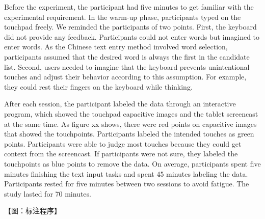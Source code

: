 Before the experiment, the participant had five minutes to get familiar with the experimental requirement. In the warm-up phase, participants typed on the touchpad freely. We reminded the participants of two points. First, the keyboard did not provide any feedback. Participants could not enter words but imagined to enter words. As the Chinese text entry method involved word selection, participants assumed that the desired word is always the first in the candidate list. Second, users needed to imagine that the keyboard prevents unintentional touches and adjust their behavior according to this assumption. For example, they could rest their fingers on the keyboard while thinking.


After each session, the participant labeled the data through an interactive program, which showed the touchpad capacitive images and the tablet screencast at the same time. As figure xx shows, there were red points on capacitive images that showed the touchpoints. Participants labeled the intended touches as green points. Participants were able to judge most touches because they could get context from the screencast. If participants were not sure, they labeled the touchpoints as blue points to remove the data. On average, participants spent five minutes finishing the text input tasks and spent 45 minutes labeling the data. Participants rested for five minutes between two sessions to avoid fatigue. The study lasted for 70 minutes.

【图：标注程序】



